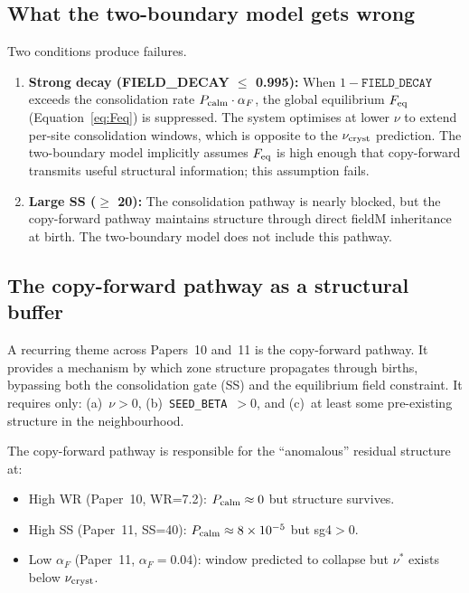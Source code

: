 \documentclass[11pt]{article}
\begin{document}
\subsection{What the two-boundary model gets wrong}

Two conditions produce failures.
\begin{enumerate}
  \item \textbf{Strong decay (FIELD\_DECAY $\leq$ 0.995):}
    When $1-\texttt{FIELD\_DECAY}$ exceeds the consolidation rate
    $P_{\rm calm} \cdot \alpha_F$, the global equilibrium $F_{\rm eq}$
    (Equation~\ref{eq:Feq}) is suppressed.
    The system optimises at lower $\nu$ to extend per-site consolidation windows,
    which is opposite to the $\nu_{\rm cryst}$ prediction.
    The two-boundary model implicitly assumes $F_{\rm eq}$ is high enough that
    copy-forward transmits useful structural information; this assumption fails.
  \item \textbf{Large SS ($\geq$ 20):}
    The consolidation pathway is nearly blocked, but the copy-forward pathway
    maintains structure through direct fieldM inheritance at birth.
    The two-boundary model does not include this pathway.
\end{enumerate}

\subsection{The copy-forward pathway as a structural buffer}

A recurring theme across Papers~10 and~11 is the copy-forward pathway.
It provides a mechanism by which zone structure propagates through births, bypassing
both the consolidation gate (SS) and the equilibrium field constraint.
It requires only: (a)~$\nu > 0$, (b)~\texttt{SEED\_BETA}~$> 0$, and (c)~at least
some pre-existing structure in the neighbourhood.

The copy-forward pathway is responsible for the ``anomalous'' residual structure at:
\begin{itemize}
  \item High WR (Paper~10, WR=7.2): $P_{\rm calm} \approx 0$ but structure survives.
  \item High SS (Paper~11, SS=40): $P_{\rm calm} \approx 8\times10^{-5}$ but sg4$>0$.
  \item Low $\alpha_F$ (Paper~11, $\alpha_F=0.04$): window predicted to collapse
    but $\nu^*$ exists below $\nu_{\rm cryst}$.
\end{itemize}
\end{document}
